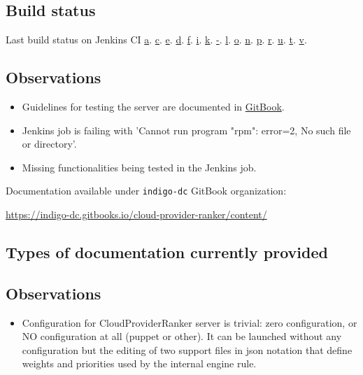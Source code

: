 \documentclass[a4wide,11pt]{article}
\begin{document}

\label{sec:func_int_test}

\subsection{Build status}
Last build status on Jenkins CI
    \href{None}{a}.
    \href{None}{c}.
    \href{None}{e}.
    \href{None}{d}.
    \href{None}{f}.
    \href{None}{i}.
    \href{None}{k}.
    \href{None}{-}.
    \href{None}{l}.
    \href{None}{o}.
    \href{None}{n}.
    \href{None}{p}.
    \href{None}{r}.
    \href{None}{u}.
    \href{None}{t}.
    \href{None}{v}.
    
\subsection{Observations}
\begin{itemize}
        \item Guidelines for testing the server are documented in \href{https://indigo-dc.gitbooks.io/cloud-provider-ranker/content/chapter1.html}{GitBook}.
        \item Jenkins job is failing with 'Cannot run program "rpm": error=2, No such file or directory'.
        \item Missing functionalities being tested in the Jenkins job.
    \end{itemize}



\label{sec:gitbook}
Documentation available under \texttt{indigo-dc} GitBook organization: \vspace{0.1em} \begin{center}\url{https://indigo-dc.gitbooks.io/cloud-provider-ranker/content/}\end{center} 
\subsection{Types of documentation currently provided}
\begin{center}
\end{center}



\label{sec:configuration}



\subsection{Observations}
\begin{itemize}
        \item Configuration for CloudProviderRanker server is trivial: zero configuration, or NO configuration at all (puppet or other). It can be launched without any configuration but the editing of two support files in json notation that define weights and priorities used by the internal engine rule.
    \end{itemize}


\newpage

\end{document}
